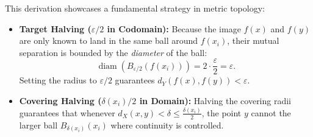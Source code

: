 \begin{proofWrapper}
\begin{content}
\begin{steps}
This derivation showcases a fundamental strategy in metric topology:
\begin{itemize}
    \item \textbf{Target Halving ($\varepsilon/2$ in Codomain):} Because the image $f(x)$ and $f(y)$ are only known to land in the same ball around $f(x_i)$, their mutual separation is bounded by the \emph{diameter} of the ball:
    \[
    \operatorname{diam}(B_{\varepsilon/2}(f(x_i))) = 2 \cdot \frac{\varepsilon}{2} = \varepsilon.
    \]
    Setting the radius to $\varepsilon/2$ guarantees $d_Y(f(x), f(y)) < \varepsilon$.
    \item \textbf{Covering Halving ($\delta(x_i)/2$ in Domain):} Halving the covering radii guarantees that whenever $d_X(x, y) < \delta \le \frac{\delta(x_i)}{2}$, the point $y$ cannot  the larger ball $B_{\delta(x_i)}(x_i)$ where continuity is controlled.
\end{itemize}
\end{steps}
\end{content}

\end{proofWrapper}

